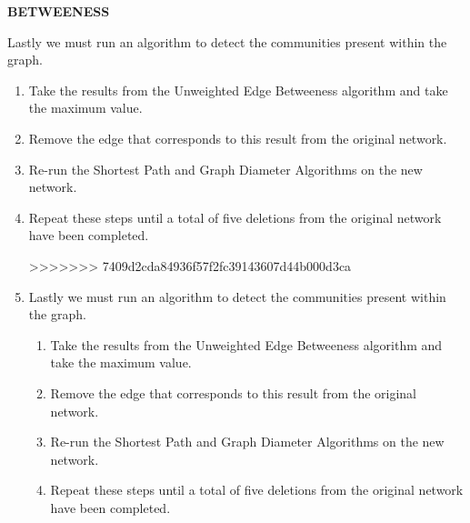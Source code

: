 \documentclass{article}
\newcommand{\placeholder}[1]{\textbf{\colorbox{red!50}{#1}}}
\begin{document}
     \item \placeholder{BETWEENESS}
     
     \item Lastly we must run an algorithm to detect the communities present within the graph.
     \begin{enumerate}
        \item Take the results from the Unweighted Edge Betweeness algorithm and take the maximum value.
        \item Remove the edge that corresponds to this result from the original network.
        \item Re-run the Shortest Path and Graph Diameter Algorithms on the new network.
        \item Repeat these steps until a total of five deletions from the original network have been completed.
        
     
>>>>>>> 7409d2cda84936f57f2fc39143607d44b000d3ca

        \item Lastly we must run an algorithm to detect the communities present within the graph.
        \begin{enumerate}
            \item Take the results from the Unweighted Edge Betweeness algorithm and take the maximum value.
            \item Remove the edge that corresponds to this result from the original network.
            \item Re-run the Shortest Path and Graph Diameter Algorithms on the new network.
            \item Repeat these steps until a total of five deletions from the original network have been completed.
        \end{enumerate}
\end{enumerate}
\end{document}
